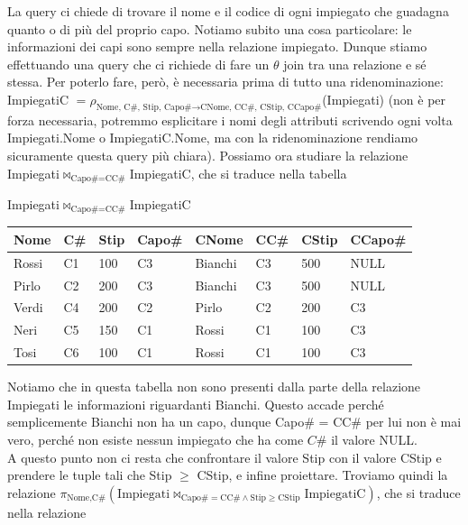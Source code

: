 \documentclass[11pt, a4paper, titlepage, oneside]{scrbook}
\begin{document}
La query ci chiede di trovare il nome e il codice di ogni impiegato che guadagna quanto o di più del proprio capo. Notiamo subito una cosa particolare: le informazioni dei capi sono sempre nella relazione impiegato. Dunque stiamo effettuando una query che ci richiede di fare un $\theta$ join tra una relazione e sé stessa. Per poterlo fare, però, è necessaria prima di tutto una ridenominazione: ImpiegatiC $= \rho_{\text{Nome, C\#, Stip, Capo\#} \rightarrow \text{CNome, CC\#, CStip, CCapo\#}}$(Impiegati) (non è per forza necessaria, potremmo esplicitare i nomi degli attributi scrivendo ogni volta Impiegati.Nome o ImpiegatiC.Nome, ma con la ridenominazione rendiamo sicuramente questa query più chiara). Possiamo ora studiare la relazione Impiegati$\bowtie_{\text{Capo\#} = \text{CC\#}}$ImpiegatiC, che si traduce nella tabella

\begin{center}
            Impiegati$\bowtie_{\text{Capo\#} = \text{CC\#}}$ImpiegatiC

\begin{tabular}{|l|l|l|l|l|l|l|l|}
\hline
\textbf{Nome} & \textbf{C\#} & \textbf{Stip} & \textbf{Capo\#} & \textbf{CNome} & \textbf{CC\#} & \textbf{CStip} & \textbf{CCapo\#} \\ \hline
Rossi & C1 & 100 & C3 & Bianchi & C3 & 500 & NULL \\
Pirlo & C2 & 200 & C3 & Bianchi & C3 & 500 & NULL \\
Verdi & C4 & 200 & C2 & Pirlo & C2 & 200 & C3 \\
Neri & C5 & 150 & C1 & Rossi & C1 & 100 & C3 \\
Tosi & C6 & 100 & C1 & Rossi & C1 & 100 & C3\\ \hline
\end{tabular}
\end{center}

Notiamo che in questa tabella non sono presenti dalla parte della relazione Impiegati le informazioni riguardanti Bianchi. Questo accade perché semplicemente Bianchi non ha un capo, dunque Capo\# = CC\# per lui non è mai vero, perché non esiste nessun impiegato che ha come $C\#$ il valore NULL.  \\
A questo punto non ci resta che confrontare il valore Stip con il valore CStip e prendere le tuple tali che Stip $\geq$ CStip, e infine proiettare. Troviamo quindi la relazione $\pi_{\text{Nome}, \text{C\#}}(\text{Impiegati}\bowtie_{\text{Capo\#} = \text{CC\#} \land \text{Stip} \geq \text{CStip}}\text{ImpiegatiC})$, che si traduce nella relazione
\end{document}
